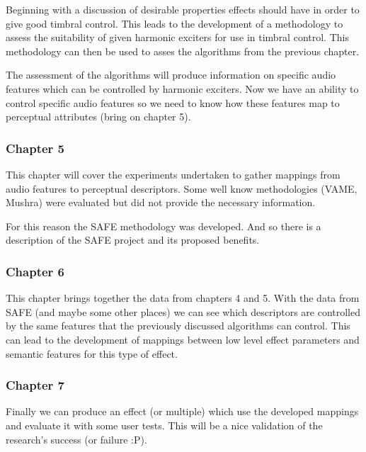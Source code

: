 \documentclass[a4paper]{article}
\begin{document}
	Beginning with a discussion of desirable properties effects should have in order to give good timbral control. This
	leads to the development of a methodology to assess the suitability of given harmonic exciters for use in timbral
	control. This methodology can then be used to asses the algorithms from the previous chapter.

	The assessment of the algorithms will produce information on specific audio features which can be controlled by
	harmonic exciters. Now we have an ability to control specific audio features so we need to know how these features
	map to perceptual attributes (bring on chapter 5).

	\subsubsection*{Chapter 5}
	This chapter will cover the experiments undertaken to gather mappings from audio features to perceptual
	descriptors. Some well know methodologies (VAME, Mushra) were evaluated but did not provide the necessary
	information.

	For this reason the SAFE methodology was developed. And so there is a description of the SAFE project and its
	proposed benefits.

	\subsubsection*{Chapter 6}
	This chapter brings together the data from chapters 4 and 5. With the data from SAFE (and maybe some other places)
	we can see which descriptors are controlled by the same features that the previously discussed algorithms can
	control. This can lead to the development of mappings between low level effect parameters and semantic features for
	this type of effect.

	\subsubsection*{Chapter 7}
	Finally we can produce an effect (or multiple) which use the developed mappings and evaluate it with some user
	tests. This will be a nice validation of the research's success (or failure :P).
\end{document}
